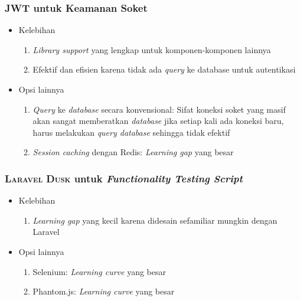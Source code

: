 	\subsubsection{\textsc{JWT} untuk Keamanan Soket}
		\begin{itemize}
			\item Kelebihan
			\begin{enumerate}
				\item \textit{Library support} yang lengkap untuk komponen-komponen lainnya
				\item Efektif dan efisien karena tidak ada \textit{query} ke database untuk autentikasi
			\end{enumerate}
			\item Opsi lainnya
			\begin{enumerate}
				\item \textit{Query} ke \textit{database} secara konvensional:  Sifat koneksi soket yang masif akan sangat memberatkan \textit{database} jika setiap kali ada koneksi baru, harus melakukan \textit{query database} sehingga tidak efektif
				\item \textit{Session caching} dengan Redis:  \textit{Learning gap} yang besar
			\end{enumerate}
		\end{itemize}
		
	\subsubsection{\textsc{Laravel Dusk} untuk \textit{Functionality Testing Script}}
		\begin{itemize}
			\item Kelebihan
			\begin{enumerate}
				\item \textit{Learning gap} yang kecil karena didesain sefamiliar mungkin dengan Laravel
			\end{enumerate}
			\item Opsi lainnya
			\begin{enumerate}
				\item Selenium:  \textit{Learning curve} yang besar
				\item Phantom.js:  \textit{Learning curve} yang besar
			\end{enumerate}
		\end{itemize}
	
	

	
	
	